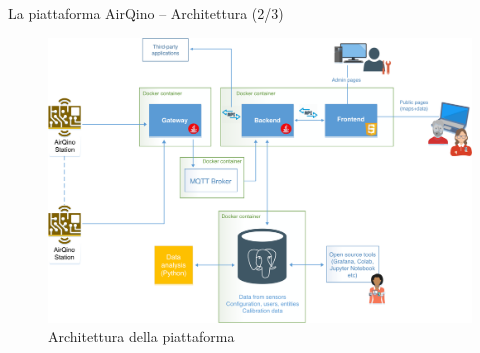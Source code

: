 \begin{frame}[t]{La piattaforma AirQino – Architettura (2/3)}
\begin{center}

\begin{figure}[H]
\centering
\captionsetup{justification=centering}
\includegraphics[width=.8\textwidth]{images/airqino_arch.png}
\caption{Architettura della piattaforma}
\end{figure}

\end{center}
\end{frame}

